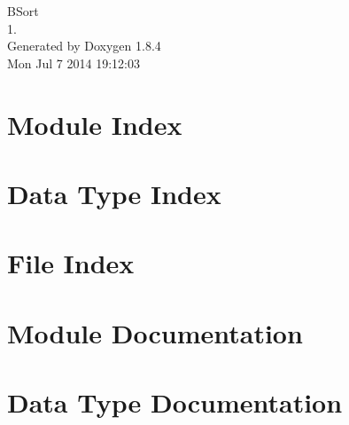 \documentclass[twoside]{book}
\newcommand{\clearemptydoublepage}{%
  \newpage{\pagestyle{empty}\cleardoublepage}%
}
\begin{document}
\hypersetup{pageanchor=false}
\begin{titlepage}
\vspace*{7cm}
\begin{center}%
{\Large B\-Sort \\[1ex]\large 1. }\\
\vspace*{1cm}
{\large Generated by Doxygen 1.8.4}\\
\vspace*{0.5cm}
{\small Mon Jul 7 2014 19:12:03}\\
\end{center}
\end{titlepage}
\clearemptydoublepage
\tableofcontents
\clearemptydoublepage
{}
\hypersetup{pageanchor=true}

\chapter{Module Index}

\chapter{Data Type Index}

\chapter{File Index}

\chapter{Module Documentation}





\chapter{Data Type Documentation}





\end{document}
